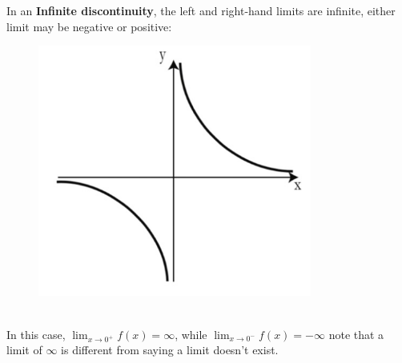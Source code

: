 \documentclass{report}
\begin{document}
In an \textbf{Infinite discontinuity}, the left and right-hand limits are infinite,
either limit may be negative or positive:
\begin{figure}[h]
\includegraphics[width=9cm]{Capture5}
\centering
{}
\end{figure}\\
In this case, $\lim_{x\to 0^+}f(x)=\infty$, while $\lim_{x\to 0^-}f(x)=-\infty$ note that a limit 
of $\infty$ is different from saying a limit doesn't exist.
\newpage
\end{document}
